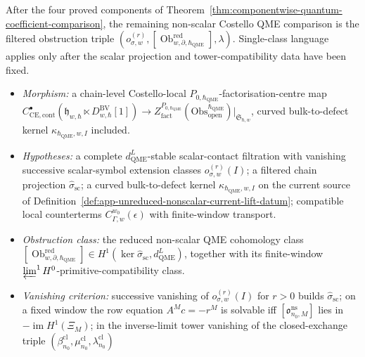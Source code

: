 \documentclass[11pt]{memoir}
\begin{document}
\begin{prob}\label{prob:quantum-p0-operation-realization}
  After the four proved components of
  Theorem~\ref{thm:componentwise-quantum-coefficient-comparison}, the
  remaining non-scalar Costello QME comparison is the filtered
  obstruction triple
  \((o_{\sigma,w}^{(r)},[\operatorname{Ob}^{\mathrm{red}}_{w,\partial,\hbar_{\mathrm{QME}}}],
  \lambda)\).  Single-class language applies only after the scalar
  projection and tower-compatibility data have been fixed.
  \begin{itemize}
	    \item \emph{Morphism:} a chain-level Costello-local
	      \(P_{0,\hbar_{\mathrm{QME}}}\)-factorisation-centre map
	      \(C^\bullet_{\mathrm{CE},\mathrm{cont}}(\mathfrak h_{w,\hbar}\ltimes D^{\mathrm{BV}}_{w,\hbar}[1])
	      \to Z^{P_{0,\hbar_{\mathrm{QME}}}}_{\mathrm{fact}}
	      (\mathrm{Obs}^{\hbar_{\mathrm{QME}}}_{\mathrm{open}})|_{\mathfrak S_{\hbar,w}}\),
	      curved bulk-to-defect kernel \(\kappa_{\hbar_{\mathrm{QME}},w,I}\) included.
    \item \emph{Hypotheses:} a complete
      \(d_{\mathrm{QME}}^{L}\)-stable scalar-contact filtration with
      vanishing successive scalar-symbol extension classes
      \(o^{(r)}_{\sigma,w}(I)\); a filtered chain projection
      \(\widehat\sigma_{\mathrm{sc}}\); a curved bulk-to-defect kernel
	      \(\kappa_{\hbar_{\mathrm{QME}},w,I}\) on the current source of
      Definition~\ref{def:app-unreduced-nonscalar-current-lift-datum};
      compatible local counterterms
      \(C_{\Gamma,w}^{w_0}(\epsilon)\) with finite-window transport.
    \item \emph{Obstruction class:} the reduced non-scalar QME
      cohomology class
      \([\operatorname{Ob}^{\mathrm{red}}_{w,\partial,\hbar_{\mathrm{QME}}}]
      \in H^1(\ker\widehat\sigma_{\mathrm{sc}},d_{\mathrm{QME}}^{L})\),
      together with its finite-window
      \(\varprojlim^1H^0\)-primitive-compatibility class.
    \item \emph{Vanishing criterion:} successive vanishing of
      \(o^{(r)}_{\sigma,w}(I)\) for \(r>0\) builds
      \(\widehat\sigma_{\mathrm{sc}}\); on a fixed window the row
      equation \(A^Mc=-r^M\) is solvable iff
      \([\mathfrak o^{\mathrm{ns}}_{n_0,M}]\) lies in
      \(-\operatorname{im}H^1(\Xi_M)\); in the inverse-limit tower
      vanishing of the closed-exchange triple
      \((\beta^{\mathrm{cl}}_{n_0},\mu^{\mathrm{cl}}_{n_0},\lambda^{\mathrm{cl}}_{n_0})\)

\end{itemize}
\end{prob}
\end{document}
